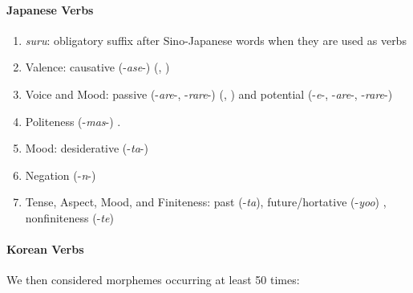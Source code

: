 \documentclass[11pt,letterpaper]{article}
\begin{document}
\paragraph{Japanese Verbs}


\begin{enumerate}
\item \textit{suru}: obligatory suffix after Sino-Japanese words when they are used as verbs
\item Valence: causative (-\textit{ase}-) (\citet[142]{hasegawa2014japanese}, \citet[Chapter 13]{kaiser2013japanese})
\item Voice and Mood: passive (-\textit{are}-, -\textit{rare}-) (\citet[152]{hasegawa2014japanese}, \citet[Chapter 12]{kaiser2013japanese}) and potential (-\textit{e}-, -\textit{are}-, -\textit{rare}-) \citep[398]{kaiser2013japanese}
\item Politeness (-\textit{mas}-) \citep[190]{kaiser2013japanese}.
\item Mood: desiderative (-\textit{ta}-) \citep[238]{kaiser2013japanese}
\item Negation (-\textit{n}-)
\item Tense, Aspect, Mood, and Finiteness: past (-\textit{ta}), future/hortative (-\textit{yoo}) \citep[229]{kaiser2013japanese}, nonfiniteness (-\textit{te}) \citep[186]{kaiser2013japanese}
\end{enumerate}



\paragraph{Korean Verbs}

We then considered morphemes occurring at least 50 times:
\end{document}
